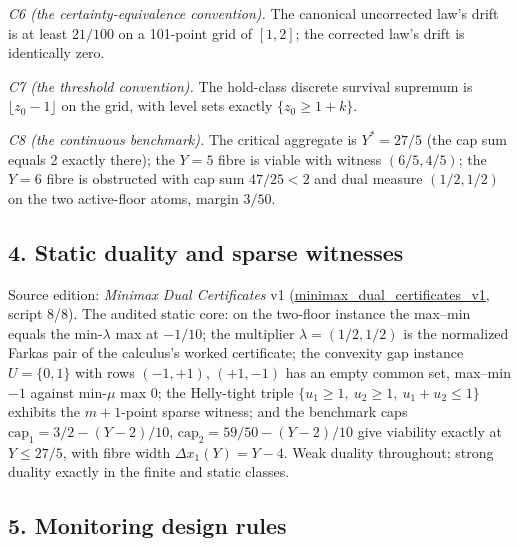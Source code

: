 \documentclass[10pt,twocolumn]{article}
\theoremstyle{definition}
\begin{document}
\emph{C6 (the certainty-equivalence convention).} The canonical uncorrected
law's drift is at least \(21/100\) on a 101-point grid of \([1,2]\); the
corrected law's drift is identically zero.

\emph{C7 (the threshold convention).} The hold-class discrete survival
supremum is \(\lfloor z_0 - 1 \rfloor\) on the grid, with level sets exactly
\(\{z_0 \ge 1 + k\}\).

\emph{C8 (the continuous benchmark).} The critical aggregate is
\(Y^{*} = 27/5\) (the cap sum equals 2 exactly there); the \(Y = 5\) fibre is
viable with witness \((6/5, 4/5)\); the \(Y = 6\) fibre is obstructed with
cap sum \(47/25 < 2\) and dual measure \((1/2, 1/2)\) on the two active-floor
atoms, margin \(3/50\).

\subsection{4. Static duality and sparse witnesses}\label{static-duality}

Source edition: \emph{Minimax Dual Certificates} v1
(\url{minimax_dual_certificates_v1}, script 8/8). The audited
static core: on the two-floor instance the max--min equals the
min-\(\lambda\) max at \(-1/10\); the multiplier \(\lambda = (1/2, 1/2)\) is
the normalized Farkas pair of the calculus's worked certificate; the
convexity gap instance \(U = \{0,1\}\) with rows \((-1,+1)\), \((+1,-1)\)
has an empty common set, max--min \(-1\) against min-\(\mu\) max \(0\); the
Helly-tight triple \(\{u_1 \ge 1,\ u_2 \ge 1,\ u_1 + u_2 \le 1\}\) exhibits
the \(m{+}1\)-point sparse witness; and the benchmark caps
\(\mathrm{cap}_1 = 3/2 - (Y-2)/10\), \(\mathrm{cap}_2 = 59/50 - (Y-2)/10\)
give viability exactly at \(Y \le 27/5\), with fibre width
\(\Delta x_1(Y) = Y - 4\). Weak duality throughout; strong duality exactly in
the finite and static classes.

\subsection{5. Monitoring design rules}\label{monitoring}
\end{document}

